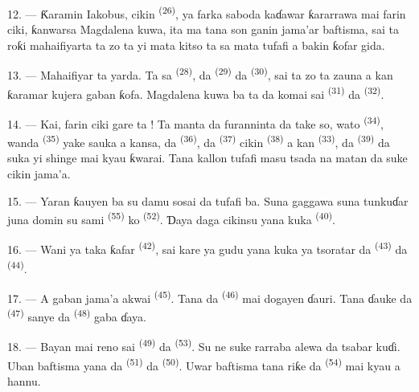 12. --- Ƙaramin Iakobus, cikin 
\textsuperscript{(26)}, ya farka saboda kaɗawar ƙararrawa mai farin
ciki, ƙanwarsa Magdalena kuwa, ita ma tana son ganin jama’ar
baftisma, sai ta roƙi mahaifiyarta ta zo ta yi mata kitso ta sa mata
tufafi a bakin ƙofar gida.

13. --- Mahaifiyar ta yarda. Ta sa 
\textsuperscript{(28)}, da  \textsuperscript{(29)}
da  \textsuperscript{(30)}, sai ta zo ta zauna a kan
ƙaramar kujera gaban ƙofa. Magdalena kuwa ba ta da komai sai
 \textsuperscript{(31)} da  \textsuperscript{(32)}.

14. --- Kai, farin ciki gare ta ! Ta manta da furanninta da take so,
wato  \textsuperscript{(34)}, wanda
 \textsuperscript{(35)} yake sauka a kansa,
da  \textsuperscript{(36)}, da  \textsuperscript{(37)} cikin 
\textsuperscript{(38)} a kan  \textsuperscript{(33)}, da
 \textsuperscript{(39)} da suka yi shinge mai kyau
ƙwarai. Tana kallon tufafi masu tsada na matan da suke cikin jama’a.

15. --- Yaran ƙauyen ba su damu sosai da tufafi ba. Suna gaggawa suna
tunkuɗar juna domin su sami  \textsuperscript{(55)} ko
 \textsuperscript{(52)}. Ɗaya daga cikinsu yana
kuka \textsuperscript{(40)}.

16. --- Wani ya taka ƙafar  \textsuperscript{(42)}, sai
kare ya gudu yana kuka ya tsoratar da 
\textsuperscript{(43)} da  \textsuperscript{(44)}.

\VUsaut{5.0mm}
\VUsaut{4.0mm}

17. --- A gaban jama’a akwai  \textsuperscript{(45)}.
Tana da  \textsuperscript{(46)} mai dogayen
ɗauri. Tana ɗauke da 
\textsuperscript{(47)} sanye da  \textsuperscript{(48)} gaba
ɗaya.

18. --- Bayan mai reno sai 
\textsuperscript{(49)} da  \textsuperscript{(53)}.
Su ne suke rarraba alewa da tsabar kuɗi. Uban baftisma yana da
 \textsuperscript{(51)} da 
\textsuperscript{(50)}. Uwar baftisma tana riƙe da  \textsuperscript{(54)} mai kyau a hannu.

